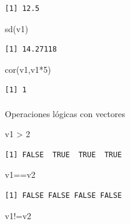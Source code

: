 \documentclass[
  letterpaper,
  DIV=11,
  numbers=noendperiod]{scrartcl}
\makeatletter
\let\oldparagraph\paragraph
\renewcommand{\paragraph}{
    \@ifstar
      \xxxParagraphStar
      \xxxParagraphNoStar
  }
\newcommand{\xxxParagraphStar}[1]{\oldparagraph*{#1}\mbox{}}
\newcommand{\xxxParagraphNoStar}[1]{\oldparagraph{#1}\mbox{}}
\newenvironment{Shaded}{\begin{snugshade}}{\end{snugshade}}
\newcommand{\DecValTok}[1]{\textcolor[rgb]{0.68,0.00,0.00}{#1}}
\newcommand{\FunctionTok}[1]{\textcolor[rgb]{0.28,0.35,0.67}{#1}}
\newcommand{\NormalTok}[1]{\textcolor[rgb]{0.00,0.23,0.31}{#1}}
\newcommand{\SpecialCharTok}[1]{\textcolor[rgb]{0.37,0.37,0.37}{#1}}
\makeatother
\begin{document}
\begin{verbatim}
[1] 12.5
\end{verbatim}

\begin{Shaded}
\begin{Highlighting}[]
\FunctionTok{sd}\NormalTok{(v1)       }
\end{Highlighting}
\end{Shaded}

\begin{verbatim}
[1] 14.27118
\end{verbatim}

\begin{Shaded}
\begin{Highlighting}[]
\FunctionTok{cor}\NormalTok{(v1,v1}\SpecialCharTok{*}\DecValTok{5}\NormalTok{) }
\end{Highlighting}
\end{Shaded}

\begin{verbatim}
[1] 1
\end{verbatim}

\paragraph{Operaciones lógicas con
vectores}\label{operaciones-luxf3gicas-con-vectores}

\begin{Shaded}
\begin{Highlighting}[]
\NormalTok{v1 }\SpecialCharTok{\textgreater{}} \DecValTok{2}      
\end{Highlighting}
\end{Shaded}

\begin{verbatim}
[1] FALSE  TRUE  TRUE  TRUE
\end{verbatim}

\begin{Shaded}
\begin{Highlighting}[]
\NormalTok{v1}\SpecialCharTok{==}\NormalTok{v2       }
\end{Highlighting}
\end{Shaded}

\begin{verbatim}
[1] FALSE FALSE FALSE FALSE
\end{verbatim}

\begin{Shaded}
\begin{Highlighting}[]
\NormalTok{v1}\SpecialCharTok{!=}\NormalTok{v2       }
\end{Highlighting}
\end{Shaded}
\end{document}
